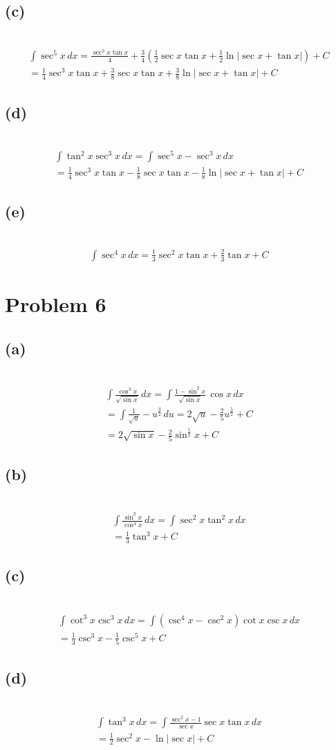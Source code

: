 \documentclass[12pt]{article}
\newcommand{\problem}[1]{\section{Problem #1}}
\newcommand{\subproblem}[1]{\subsection{(#1)} \,}
\begin{document}
\subproblem{c}
\begin{gather*}
    \int \sec^5  x\,d x = \frac{\sec^3x\tan x}{4} + \frac{3}{4}(\frac{1}{2}\sec x \tan x + \frac{1}{2} \ln |\sec x +\tan x |)+C\\
    =\boxed{\frac{1}{4} \sec^3 x\tan x +\frac{3}{8} \sec x \tan x +\frac{3}{8} \ln|\sec x +\tan x| +C}
\end{gather*}

\subproblem{d}
\begin{gather*}
    \int \tan^2 x \sec^3 x \,d x = \int \sec^5x-\sec^3 x \, dx\\
    =\boxed{\frac{1}{4} \sec^3 x\tan x -\frac{1}{8} \sec x \tan x -\frac{1}{8} \ln|\sec x +\tan x| +C}
\end{gather*}

\subproblem{e}
\begin{gather*}
    \int \sec^4 x\, dx= \boxed{\frac{1}{3}\sec^2 x\tan x +\frac{2}{3} \tan x +C}
\end{gather*}

\problem{6}

\subproblem{a}
\begin{gather*}
    \int \frac{\cos^3x}{\sqrt{\sin x }} \, dx =\int \frac{1-\sin^2x}{\sqrt{\sin x}} \, \cos x \, dx\\
    = \int \frac{1}{\sqrt{u}} - u^\frac{3}{2} \, du = 2\sqrt u - \frac{2}{5} u^\frac{5}{2}+C\\
    = \boxed{2\sqrt{\sin x} - \frac{2}{5}\sin ^\frac{5}{2}x+C}
\end{gather*}

\subproblem{b}
\begin{gather*}
    \int \frac{\sin^2x}{\cos^4 x} \, dx = \int \sec^2 x\tan ^2 x\, dx\\
    =\boxed{\frac{1}{3}\tan^3  x + C}
\end{gather*}

\subproblem{c}
\begin{gather*}
    \int \cot^3x \csc ^3 x \, dx = \int (\csc ^4 x - \csc ^2 x )\cot x \csc x \, dx\\
    = \boxed{\frac{1}{3}\csc^3 x -\frac{1}{5}\csc ^5 x +C}
\end{gather*}

\subproblem{d}
\begin{gather*}
    \int \tan^3 x\, dx = \int \frac{\sec^2x-1}{\sec x} \sec x\tan x \, dx\\
    = \boxed{\frac{1}{2}\sec^2 x - \ln |\sec x|+C}
\end{gather*}
\end{document}
